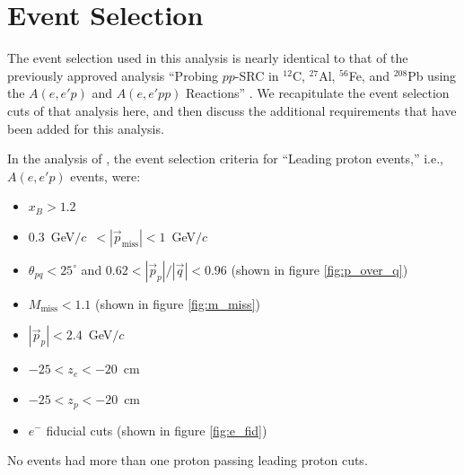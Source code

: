 \documentclass{article}
\begin{document}
\section{Event Selection}
\label{sec:data}

The event selection used in this analysis is nearly identical to that of the 
previously approved analysis ``Probing $pp$-SRC in $^{12}$C, $^{27}$Al, $^{56}$Fe, and $^{208}$Pb 
using the $A(e,e'p)$ and $A(e,e'pp)$ Reactions'' \cite{Or:note}. We recapitulate
the event selection cuts of that analysis here, and then discuss the additional
requirements that have been added for this analysis. 

In the analysis of \cite{Or:note}, the event selection criteria for ``Leading proton events,'' 
i.e., $A(e,e'p)$ events, were:
\begin{itemize}
\item $x_B > 1.2$
\item 0.3~GeV$/c$~$< |\vec{p}_\text{miss}| < 1$~GeV$/c$
\item $\theta_{pq} < 25^\circ$ and $0.62 < |\vec{p}_p|/|\vec{q}| < 0.96$ (shown in figure \ref{fig:p_over_q})
\item $M_\text{miss} < 1.1$ (shown in figure \ref{fig:m_miss})
\item $|\vec{p}_p| < 2.4$~GeV$/c$
\item $-25 < z_e < -20$~cm
\item $-25 < z_p < -20$~cm
\item $e^-$ fiducial cuts (shown in figure \ref{fig:e_fid})
\end{itemize}
No events had more than one proton passing leading proton cuts.
\end{document}
